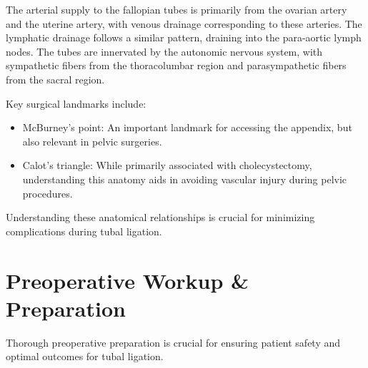 The arterial supply to the fallopian tubes is primarily from the ovarian artery and the uterine artery, with venous drainage corresponding to these arteries. The lymphatic drainage follows a similar pattern, draining into the para-aortic lymph nodes. The tubes are innervated by the autonomic nervous system, with sympathetic fibers from the thoracolumbar region and parasympathetic fibers from the sacral region. 

Key surgical landmarks include:

\begin{itemize}
  \item McBurney's point: An important landmark for accessing the appendix, but also relevant in pelvic surgeries.
  \item Calot's triangle: While primarily associated with cholecystectomy, understanding this anatomy aids in avoiding vascular injury during pelvic procedures.
\end{itemize}

Understanding these anatomical relationships is crucial for minimizing complications during tubal ligation.

\section*{Preoperative Workup \& Preparation}
Thorough preoperative preparation is crucial for ensuring patient safety and optimal outcomes for tubal ligation.

